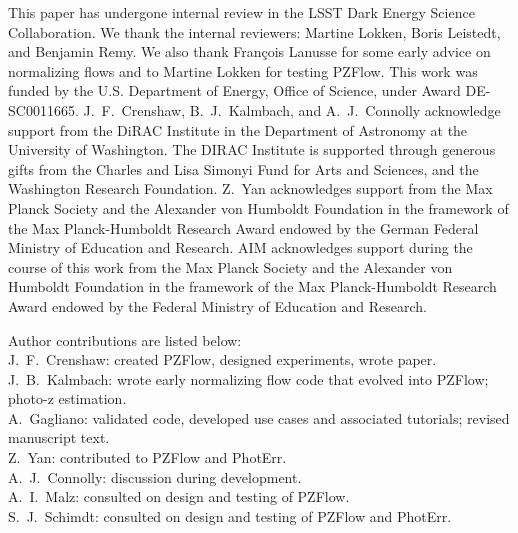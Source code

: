 \documentclass[twocolumn,twocolappendix]{aastex631}
\begin{document}
\begin{acknowledgements}
    This paper has undergone internal review in the LSST Dark Energy Science Collaboration.
    We thank the internal reviewers: Martine Lokken, Boris Leistedt, and Benjamin Remy.
    We also thank François Lanusse for some early advice on normalizing flows and to Martine Lokken for testing PZFlow.
    This work was funded by the U.S. Department of Energy, Office of Science, under Award DE-SC0011665.
    J.~F.~Crenshaw, B.~J.~Kalmbach, and A.~J.~Connolly acknowledge support from the DiRAC Institute in the Department of Astronomy at the University of Washington.
    The DIRAC Institute is supported through generous gifts from the Charles and Lisa Simonyi Fund for Arts and Sciences, and the Washington Research Foundation.
    Z.~Yan acknowledges support from the Max Planck Society and the Alexander von Humboldt Foundation in the framework of the Max Planck-Humboldt Research Award endowed by the German Federal Ministry of Education and Research.
    AIM acknowledges support during the course of this work from the Max Planck Society and the Alexander von Humboldt Foundation in the framework of the Max Planck-Humboldt Research Award endowed by the Federal Ministry of Education and Research.

    Author contributions are listed below: \\
    J.~F.~Crenshaw: created PZFlow, designed experiments, wrote paper. \\
    J.~B.~Kalmbach: wrote early normalizing flow code that evolved into PZFlow; photo-z estimation. \\
    A.~Gagliano: validated code, developed use cases and associated tutorials; revised manuscript text. \\
    Z.~Yan: contributed to PZFlow and PhotErr. \\
    A.~J.~Connolly: discussion during development. \\
    A.~I.~Malz: consulted on design and testing of PZFlow. \\
    S.~J.~Schimdt: consulted on design and testing of PZFlow and PhotErr. \\
\end{acknowledgements}

\end{document}
